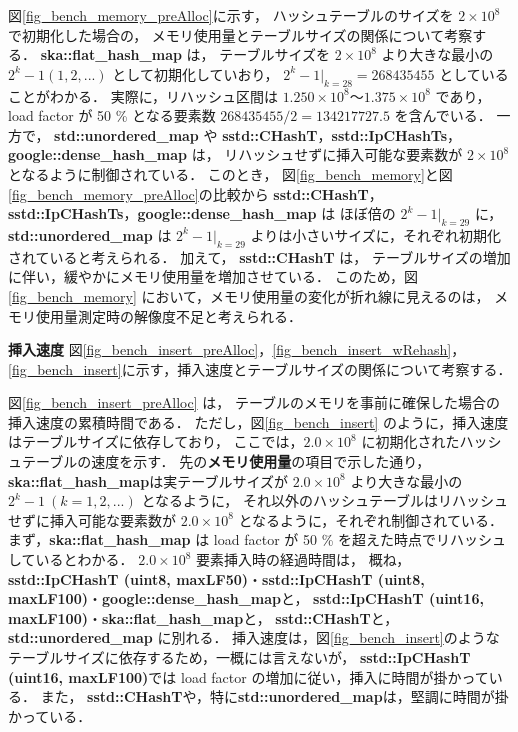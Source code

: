 図\ref{fig_bench_memory_preAlloc}に示す，
ハッシュテーブルのサイズを $2\times10^8$ で初期化した場合の，
メモリ使用量とテーブルサイズの関係について考察する．
{\bf ska::flat\_hash\_map} は，
テーブルサイズを $2\times10^8$ より大きな最小の $2^k-1 (1,2,...)$ として初期化していおり，
$2^k-1|_{k=28} = 268435455$ としていることがわかる．
実際に，リハッシュ区間は $1.250\times10^8〜1.375\times10^8$ であり，
load factor が 50 \% となる要素数 $268435455/2=134217727.5$ を含んでいる．
一方で，
{\bf std::unordered\_map} や {\bf sstd::CHashT}，{\bf sstd::IpCHashTs}，{\bf google::dense\_hash\_map} は，
リハッシュせずに挿入可能な要素数が $2\times10^8$ となるように制御されている．
このとき，
図\ref{fig_bench_memory}と図\ref{fig_bench_memory_preAlloc}の比較から
{\bf sstd::CHashT}，{\bf sstd::IpCHashTs}，{\bf google::dense\_hash\_map} は
ほぼ倍の $2^k-1|_{k=29}$ に，
{\bf std::unordered\_map} は  $2^k-1|_{k=29}$ よりは小さいサイズに，それぞれ初期化されていると考えられる．
加えて，
{\bf sstd::CHashT} は，
テーブルサイズの増加に伴い，緩やかにメモリ使用量を増加させている．
このため，図\ref{fig_bench_memory} において，メモリ使用量の変化が折れ線に見えるのは，
メモリ使用量測定時の解像度不足と考えられる．
\leavevmode \newline

%
{\bf 挿入速度}
\samepage\newline\indent
図\ref{fig_bench_insert_preAlloc}，\ref{fig_bench_insert_wRehash}，\ref{fig_bench_insert}に示す，挿入速度とテーブルサイズの関係について考察する．

図\ref{fig_bench_insert_preAlloc} は，
テーブルのメモリを事前に確保した場合の挿入速度の累積時間である．
ただし，図\ref{fig_bench_insert} のように，挿入速度はテーブルサイズに依存しており，
ここでは，$2.0\times10^8$ に初期化されたハッシュテーブルの速度を示す．
先の{\bf メモリ使用量}の項目で示した通り，
{\bf ska::flat\_hash\_map}は実テーブルサイズが $2.0\times10^8$ より大きな最小の $2^k-1\ (k=1,2,...)$ となるように，
それ以外のハッシュテーブルはリハッシュせずに挿入可能な要素数が $2.0\times10^8$ となるように，それぞれ制御されている．
まず，{\bf ska::flat\_hash\_map} は load factor が 50 \% を超えた時点でリハッシュしているとわかる．
$2.0\times10^8$ 要素挿入時の経過時間は，
概ね，
{\bf sstd::IpCHashT (uint8, maxLF50)}・{\bf sstd::IpCHashT (uint8, maxLF100)}・{\bf google::dense\_hash\_map}と，
{\bf sstd::IpCHashT (uint16, maxLF100)}・{\bf ska::flat\_hash\_map}と，
{\bf sstd::CHashT}と，
{\bf std::unordered\_map} に別れる．
挿入速度は，図\ref{fig_bench_insert}のようなテーブルサイズに依存するため，一概には言えないが，
{\bf sstd::IpCHashT (uint16, maxLF100)}では load factor の増加に従い，挿入に時間が掛かっている．
また，
{\bf sstd::CHashT}や，特に{\bf std::unordered\_map}は，堅調に時間が掛かっている．

